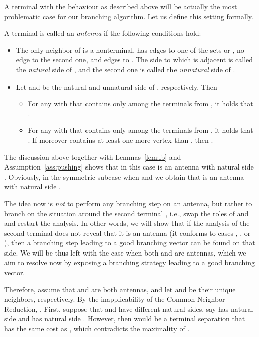 A terminal  with the behaviour as described above will be actually the most problematic case for our branching algorithm. Let us define this setting formally.
\begin{definition}
A terminal  is called an {\em{antenna}} if the following conditions hold:
\begin{itemize}
\item The only neighbor  of  is a nonterminal, has  edges to one of the sets  or , no edge to the second one, and  edges to . The side  to which  is adjacent is called the {\em{natural}} side of , and the second one is called the {\em{unnatural}} side of .
\item Let  and  be the natural and unnatural side of , respectively. Then 
\begin{itemize}
\item For any  with  that contains only  among the terminals from , it holds that .
\item For any  with  that contains only  among the terminals from , it holds that . If moreover  contains at least one more vertex than , then .
\end{itemize}
\end{itemize}
\end{definition}

The discussion above together with Lemmas~\ref{lem:lb} and Assumption~\ref{ass:pushing} shows that in this case  is an antenna with natural side . Obviously, in the symmetric subcase when  and  we obtain that  is an antenna with natural side . 

The idea now is {\em{not}} to perform any branching step on an antenna, but rather to branch on the situation around the second terminal , i.e., swap the roles of  and  and restart the analysis.
In other words, we will show that if the analysis of the second terminal  does not reveal that it is an antenna (it conforms to cases , , or ), then a branching step leading to a good branching vector can be found on that side. We will be thus left with the case when both  and  are antennas, which we aim to resolve now by exposing a branching strategy leading to a good branching vector.

Therefore, assume that  and  are both antennas, and let  and  be their unique neighbors, respectively. By the inapplicability of the Common Neighbor Reduction, . First, suppose that  and  have different natural sides, say  has natural side  and  has natural side . However, then  would be a terminal separation that has the same cost as , which contradicts the maximality of .

